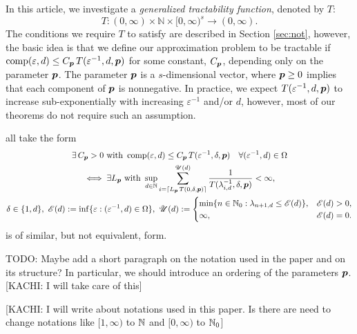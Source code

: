 \documentclass[sort&compress]{elsarticle}
\newcommand{\thed}{\delta}
\newcommand{\theM}{\mathscr{E}}
\newcommand{\theUB}{\mathscr{U}}
\newcommand{\peter}[1]{\begingroup\color{violet}#1\endgroup}
\newcommand{\kachi}[1]{\begingroup\color{ForestGreen}#1\endgroup}
\begin{document}
In this article, we investigate a \emph{generalized tractability function}, denoted by $T$:
\begin{equation} \label{eq:Tspec}
    T :(0,\infty) \times \mathbb{N} \times [0,\infty)^s \rightarrow (0,\infty).
\end{equation}
The conditions we require $T$ to satisfy are described in  Section \ref{sec:not}, however, the basic idea is that we define our approximation problem to be tractable if $\operatorname{comp}(\varepsilon, d) \le  C_{\boldsymbol{p}}\, T(\varepsilon^{-1},d,\boldsymbol{p})$ for some constant, $C_{\boldsymbol{p}}$, depending only on the parameter $\boldsymbol{p}$. \kachi{The parameter $\boldsymbol{p}$ is a $s$-dimensional vector, where $\boldsymbol{p} \geq 0$ implies that each component of $\boldsymbol{p}$ is nonnegative.} In practice, we expect $T(\varepsilon^{-1},d,\boldsymbol{p})$ to increase sub-exponentially  with increasing $\varepsilon^{-1}$ and/or $d$, however, most of our theorems do not require such an assumption.

 all take the form
\begin{multline}
  \exists \,C_{\vp} > 0 \text{ with }
    \comp(\varepsilon, d) \le  C_{\vp}\, T(\varepsilon^{-1},\thed,\vp) \quad \forall (\varepsilon^{-1},d) \in \Omega \\
    \iff   \exists L_{\vp} \text{ with }
    \sup_{d \in \naturals}
     \sum_{i = \lceil L_{\vp}\, T(0,\thed,\vp) \rceil}^{\theUB(d)} \frac{1}{T(\lambda^{-1}_{i,d},\thed,\vp)}< \infty, \\
     \thed \in \{1,d\}, \ \theM(d) := \inf \{\varepsilon : (\varepsilon^{-1},d) \in \Omega \}, \ 
     \theUB(d) := \begin{cases}
        \min\{n \in \natzero : \lambda_{n+1,d} \le \theM(d) \}, &   \theM(d) > 0, \\
        \infty, & \theM(d) = 0.
        \end{cases}
\end{multline}
 is of similar, but not equivalent, form.


\peter{TODO: Maybe add a short paragraph on the notation used in the paper and on its structure? In particular, we should introduce
an ordering of the parameters $\boldsymbol{p}$.}[\kachi{KACHI: I will take care of this}] 

\kachi{[KACHI: I will write about notations used in this paper. Is there are need to change notations like $[1,\infty)$ to $\mathbb{N}$ and $[0,\infty)$ to $\mathbb{N}_0$]}
\end{document}
